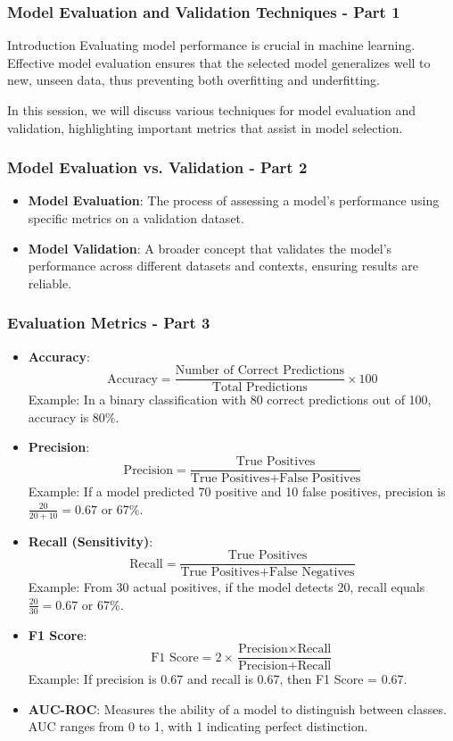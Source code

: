 \documentclass[aspectratio=169]{beamer}
\begin{document}
\begin{frame}[fragile]
    \frametitle{Model Evaluation and Validation Techniques - Part 1}
    \begin{block}{Introduction}
        Evaluating model performance is crucial in machine learning. Effective model evaluation ensures that the selected model generalizes well to new, unseen data, thus preventing both overfitting and underfitting. 
    \end{block}
    In this session, we will discuss various techniques for model evaluation and validation, highlighting important metrics that assist in model selection.
\end{frame}

\begin{frame}[fragile]
    \frametitle{Model Evaluation vs. Validation - Part 2}
    \begin{itemize}
        \item \textbf{Model Evaluation}: The process of assessing a model's performance using specific metrics on a validation dataset.
        \item \textbf{Model Validation}: A broader concept that validates the model's performance across different datasets and contexts, ensuring results are reliable.
    \end{itemize}
\end{frame}

\begin{frame}[fragile]
    \frametitle{Evaluation Metrics - Part 3}
    \begin{itemize}
        \item \textbf{Accuracy}:
        \[
        \text{Accuracy} = \frac{\text{Number of Correct Predictions}}{\text{Total Predictions}} \times 100
        \]
        Example: In a binary classification with 80 correct predictions out of 100, accuracy is 80\%.

        \item \textbf{Precision}:
        \[
        \text{Precision} = \frac{\text{True Positives}}{\text{True Positives} + \text{False Positives}}
        \]
        Example: If a model predicted 70 positive and 10 false positives, precision is \( \frac{20}{20 + 10} = 0.67 \) or 67\%.

        \item \textbf{Recall (Sensitivity)}:
        \[
        \text{Recall} = \frac{\text{True Positives}}{\text{True Positives} + \text{False Negatives}}
        \]
        Example: From 30 actual positives, if the model detects 20, recall equals \( \frac{20}{30} = 0.67 \) or 67\%.

        \item \textbf{F1 Score}:
        \[
        \text{F1 Score} = 2 \times \frac{\text{Precision} \times \text{Recall}}{\text{Precision} + \text{Recall}}
        \]
        Example: If precision is 0.67 and recall is 0.67, then F1 Score = 0.67.

        \item \textbf{AUC-ROC}: Measures the ability of a model to distinguish between classes. AUC ranges from 0 to 1, with 1 indicating perfect distinction.
    \end{itemize}
\end{frame}
\end{document}
